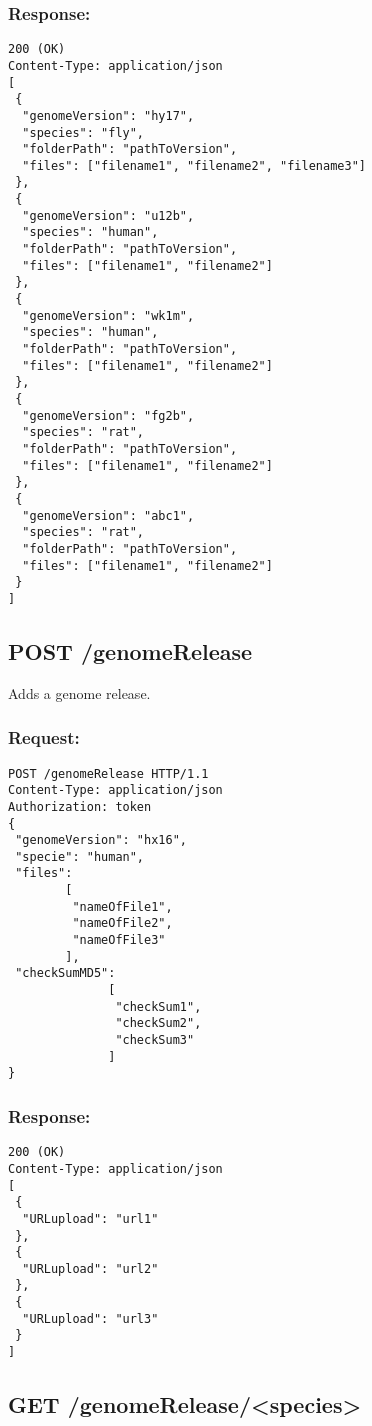 \subsubsection*{Response:}
\begin{verbatim}
200 (OK)
Content-Type: application/json
[
 {
  "genomeVersion": "hy17",
  "species": "fly",
  "folderPath": "pathToVersion",
  "files": ["filename1", "filename2", "filename3"]
 }, 
 {
  "genomeVersion": "u12b",
  "species": "human",
  "folderPath": "pathToVersion",
  "files": ["filename1", "filename2"]
 },
 {
  "genomeVersion": "wk1m",
  "species": "human",
  "folderPath": "pathToVersion",
  "files": ["filename1", "filename2"]
 },
 {
  "genomeVersion": "fg2b",
  "species": "rat",
  "folderPath": "pathToVersion",
  "files": ["filename1", "filename2"]
 },
 {
  "genomeVersion": "abc1",
  "species": "rat",
  "folderPath": "pathToVersion",
  "files": ["filename1", "filename2"]
 }
]
\end{verbatim}

\subsection*{POST /genomeRelease}

Adds a genome release.

\subsubsection*{Request:}
\begin{verbatim}
POST /genomeRelease HTTP/1.1
Content-Type: application/json
Authorization: token
{
 "genomeVersion": "hx16",
 "specie": "human", 
 "files":
        [
         "nameOfFile1",
         "nameOfFile2",
         "nameOfFile3"
        ],
 "checkSumMD5": 
              [
               "checkSum1",
               "checkSum2",
               "checkSum3"
              ]
}
\end{verbatim}

\subsubsection*{Response:}
\begin{verbatim}
200 (OK)
Content-Type: application/json
[
 {
  "URLupload": "url1"
 },
 {
  "URLupload": "url2"
 },
 {
  "URLupload": "url3"
 }
]
\end{verbatim}

\subsection*{GET /genomeRelease/<species>}

